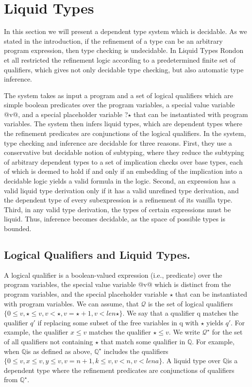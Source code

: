 	\newcommand\qset{\ensuremath{\mathbb{Q}}}

\section{Liquid Types}


In this section we will present a dependent type system which is decidable.
As we stated in the introduction, if the refinement of a type can be an arbitrary 
program expression, then type checking is undecidable.
%
In Liquid Types Rondon et all restricted the refinement logic according to a predetermined 
finite set of qualifiers,  which gives not only decidable type checking, but also automatic
type inference.



The system takes as input a program and a set of logical qualifiers
which are simple boolean predicates over the program variables, a
special value variable @v@, and a special placeholder variable ?$\star$ that
can be instantiated with program variables. The system then infers
liquid types, which are dependent types where the refinement predicates are conjunctions of the logical qualifiers.
In the system, type checking and inference are decidable for
three reasons. 
%
First, they use a conservative but decidable
notion of subtyping, where they reduce the subtyping of arbitrary
dependent types to a set of implication checks over base types,
each of which is deemed to hold if and only if an embedding of
the implication into a decidable logic yields a valid formula in
the logic. 
%
Second, an expression has a valid liquid type derivation
only if it has a valid unrefined type derivation, and the dependent 
type of every subexpression is a refinement of its vanilla type. 
%
Third, in any valid type derivation, the types of certain expressions
must be liquid. Thus, inference becomes decidable, as the space of
possible types is bounded. 


\subsection{Logical Qualifiers and Liquid Types.}

A logical qualifier is a
boolean-valued expression (i.e., predicate) over the program variables, 
the special value variable @v@ which is distinct from the
program variables, and the special placeholder variable $\star$ that
can be instantiated with program variables. 
We can assume, that $\mathcal{Q}$ is the set of logical qualifiers
$\{0 \leq v, \star \leq v, v < \star,  v = \star + 1, v < len \star\}$. 
%
We say that
a qualifier q matches the qualifier $q'$
if replacing some subset of
the free variables in q with $\star$ yields $q'$.
For example, the qualifier
$x \leq v$ matches the qualifier $\star \leq v$. 
We write $\mathcal{Q}^\star$
for the set of all
qualifiers not containing $\star$ that match some qualifier in \qset. 
For example, when \qset is as defined as above, $\qset^\star$
includes the qualifiers
$\{0 \leq v, x \leq v, y \leq v, v = n + 1, k \leq v, v <n, v < len a \}$. 
A liquid type over \qset is a dependent type where the refinement predicates are
conjunctions of qualifiers from $\qset ^ \star$.


